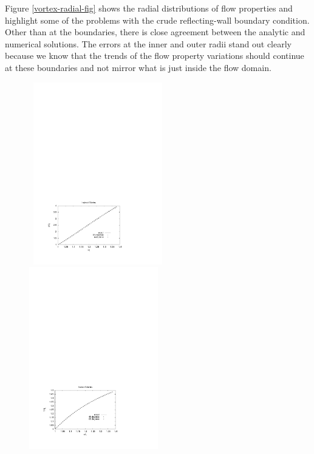 Figure \ref{vortex-radial-fig} shows the radial distributions of flow properties 
and highlight some of the problems with 
the crude reflecting-wall boundary condition.
Other than at the boundaries, there is close agreement between the analytic
and numerical solutions.
The errors at the inner and outer radii stand out clearly because we
know that the trends of the flow property variations should continue
at these boundaries and not mirror what is just inside the flow domain.

\begin{figure}[htbp]
\begin{center}
\mbox{
\includegraphics[width=0.5\textwidth,viewport=66 60 408 292,clip=true]{../2D/vortex/radial_profile_p.pdf}
\includegraphics[width=0.5\textwidth,viewport=66 60 408 292,clip=true]{../2D/vortex/radial_profile_T.pdf}
}
\end{center}
\end{figure}
